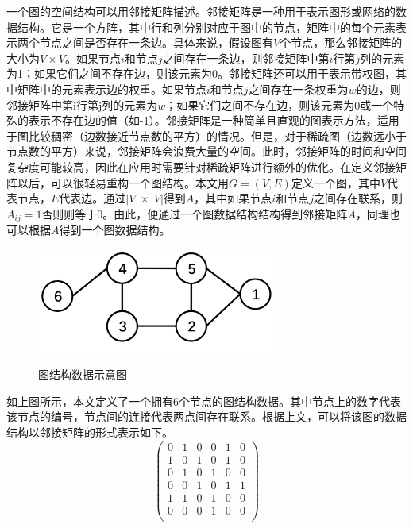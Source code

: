 一个图的空间结构可以用邻接矩阵描述。邻接矩阵是一种用于表示图形或网络的数据结构。它是一个方阵，其中行和列分别对应于图中的节点，矩阵中的每个元素表示两个节点之间是否存在一条边。具体来说，假设图有$V$个节点，那么邻接矩阵的大小为$V \times V$。如果节点$i$和节点$j$之间存在一条边，则邻接矩阵中第$i$行第$j$列的元素为1；如果它们之间不存在边，则该元素为0。邻接矩阵还可以用于表示带权图，其中矩阵中的元素表示边的权重。如果节点$i$和节点$j$之间存在一条权重为$w$的边，则邻接矩阵中第i行第j列的元素为$w$；如果它们之间不存在边，则该元素为0或一个特殊的表示不存在边的值（如-1）。邻接矩阵是一种简单且直观的图表示方法，适用于图比较稠密（边数接近节点数的平方）的情况。但是，对于稀疏图（边数远小于节点数的平方）来说，邻接矩阵会浪费大量的空间。此时，邻接矩阵的时间和空间复杂度可能较高，因此在应用时需要针对稀疏矩阵进行额外的优化。在定义邻接矩阵以后，可以很轻易重构一个图结构。本文用$G=(V,E)$定义一个图，其中$V$代表节点，$E$代表边。通过$\left|V\right| \times \left|V\right|$得到$A$，其中如果节点$i$和节点$j$之间存在联系，则$A_{ij}=1$否则则等于0。由此，便通过一个图数据结构结构得到邻接矩阵$A$，同理也可以根据$A$得到一个图数据结构。
\begin{figure}[ht]
    \centering
    \includegraphics[width=0.70\textwidth]{FigMa/Graph_structure.png}\\
    \vspace{-0.3cm}
    \caption{图结构数据示意图}
    \label{fig:Graph_structure}
\end{figure}
如上图所示，本文定义了一个拥有6个节点的图结构数据。其中节点上的数字代表该节点的编号，节点间的连接代表两点间存在联系。根据上文，可以将该图的数据结构以邻接矩阵的形式表示如下。
\begin{equation}
\begin{pmatrix}
        0 & 1 & 0 & 0 & 1 & 0 \\
        1 & 0 & 1 & 0 & 1 & 0 \\
        0 & 1 & 0 & 1 & 0 & 0 \\
        0 & 0 & 1 & 0 & 1 & 1 \\
        1 & 1 & 0 & 1 & 0 & 0 \\
        0 & 0 & 0 & 1 & 0 & 0 \\
\end{pmatrix}
\label{equation:adj_mat}
\end{equation}
